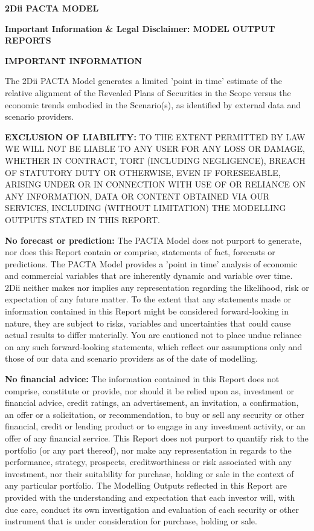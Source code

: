 \documentclass[10pt,table,a4]{article}\usepackage[]{graphicx}\usepackage[]{color}
\begin{document}
	
	
	
	
	\newpage
	\pagecolor{white}


	\begin{center}
		\textbf{2Dii PACTA MODEL}
		
		\textbf{Important Information \& Legal Disclaimer: MODEL OUTPUT REPORTS}
		
		\textbf{IMPORTANT INFORMATION}
		
	\end{center}
	
	
	The 2Dii PACTA Model generates a limited 'point in time' estimate of the relative alignment of the Revealed Plans of Securities in the Scope versus the economic trends embodied in the Scenario(s), as identified by external data and scenario providers. 
	
	\textbf{EXCLUSION OF LIABILITY: }TO THE EXTENT PERMITTED BY LAW WE WILL NOT BE LIABLE TO ANY USER FOR ANY LOSS OR DAMAGE, WHETHER IN CONTRACT, TORT (INCLUDING NEGLIGENCE), BREACH OF STATUTORY DUTY OR OTHERWISE, EVEN IF FORESEEABLE, ARISING UNDER OR IN CONNECTION WITH USE OF OR RELIANCE ON ANY INFORMATION, DATA OR CONTENT OBTAINED VIA OUR SERVICES, INCLUDING (WITHOUT LIMITATION) THE MODELLING OUTPUTS STATED IN THIS REPORT.
	
	\textbf{No forecast or prediction: }The PACTA Model does not purport to generate, nor does this Report contain or comprise, statements of fact, forecasts or predictions. The PACTA Model provides a 'point in time' analysis of economic and commercial variables that are inherently dynamic and variable over time. 2Dii neither makes nor implies any representation regarding the likelihood, risk or expectation of any future matter. To the extent that any statements made or information contained in this Report might be considered forward-looking in nature, they are subject to risks, variables and uncertainties that could cause actual results to differ materially. You are cautioned not to place undue reliance on any such forward-looking statements, which reflect our assumptions only and those of our data and scenario providers as of the date of modelling.
	
	\textbf{No financial advice: }The information contained in this Report does not comprise, constitute or provide, nor should it be relied upon as, investment or financial advice, credit ratings, an advertisement, an invitation, a confirmation, an offer or a solicitation, or recommendation, to buy or sell any security or other financial, credit or lending product or to engage in any investment activity, or an offer of any financial service. This Report does not purport to quantify risk to the portfolio (or any part thereof), nor make any representation in regards to the performance, strategy, prospects, creditworthiness or risk associated with any investment, nor their suitability for purchase, holding or sale in the context of any particular portfolio. The Modelling Outputs reflected in this Report are provided with the understanding and expectation that each investor will, with due care, conduct its own investigation and evaluation of each security or other instrument that is under consideration for purchase, holding or sale. 
	
\end{document}
